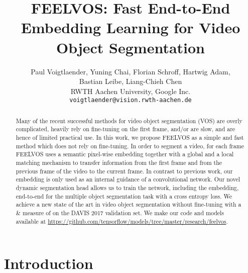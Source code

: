 \documentclass[10pt,twocolumn,letterpaper]{article}
\begin{document}
\title{FEELVOS: Fast End-to-End Embedding Learning for Video Object Segmentation}


\author{
  \hspace{-1.3cm}
  \begin{tabular}[t]{c}
    Paul Voigtlaender, Yuning Chai, Florian Schroff, Hartwig Adam,\\  Bastian Leibe, Liang-Chieh Chen \\
    RWTH Aachen University, Google Inc.\\
    {\tt\small voigtlaender@vision.rwth-aachen.de}
\end{tabular}
}

\maketitle

\ifcvprfinal
\let\thefootnote\relax{}
\thispagestyle{empty}
\fi

\begin{abstract}
   Many of the recent successful methods for video object segmentation (VOS) are overly complicated, heavily rely on fine-tuning on the first frame, and/or are slow, and are hence of limited practical use. In this work, we propose FEELVOS as a simple and fast method which does not rely on fine-tuning. In order to segment a video, for each frame FEELVOS uses a semantic pixel-wise embedding together with a global and a local matching mechanism to transfer information from the first frame and from the previous frame of the video to the current frame. In contrast to previous work, our embedding is only used as an internal guidance of a convolutional network. Our novel dynamic segmentation head allows us to train the network, including the embedding, end-to-end for the multiple object segmentation task with a cross entropy loss. We achieve a new state of the art in video object segmentation without fine-tuning with a \& measure of  on the DAVIS 2017 validation set. We make our code and models available at \url{https://github.com/tensorflow/models/tree/master/research/feelvos}.
\end{abstract}

\section{Introduction}
\label{sec:intro}
\end{document}
